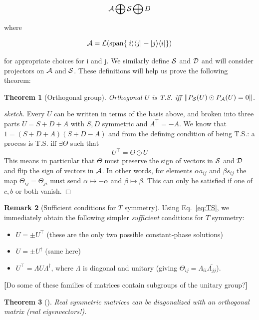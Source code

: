 \documentclass[aps,pra,12pt,nofootinbib,superscriptaddress,longbibliography,showpacs]{revtex4-1}
\newcommand{\yo}[1]{\textcolor{dblue}{\textbf{[}#1\textbf{]}}}
\theoremstyle{plain}
\newtheorem{theorem}{Theorem}   %
\theoremstyle{definition}
\newtheorem{remark}[theorem]{Remark}
\newcommand{\bra}[1]{\mbox{$\langle #1|$}}
\newcommand{\ket}[1]{\ensuremath{|#1\rangle}}
\newcommand{\hprod}{\odot}
\def\2#1{{\cal #1}}
\begin{document}
$$ \2 A \bigoplus \2 S \bigoplus D $$ 

where 

$$ \2 A = \2L (\text{span} \{\ket{i}\bra{j} - \ket{j}\bra{i}\}) $$ 

for appropriate choices for i and j.  We similarly define $\2 S$ and $\2 D$ and will consider projectors on $\2A$ and $\2S$.  These definitions will help us prove the following 
theorem: 

\begin{theorem}[Orthogonal group] 
Orthogonal $U$ is T.S. iff $\Arrowvert P_{\2S}(U)\hprod P_{\2A}(U) = 0 \Arrowvert$.
\end{theorem}

\begin{proof}[sketch] 
Every $U$ can be written in terms of the basis above, and broken into three parts 
$U = S + D + A$ 
with $S,D$ symmetric and $A^\top = -A$. 
We know that 
$1 = (S+D+A)(S+D-A)$
and from the defining condition of being T.S.: a process is T.S. iff $\exists \Theta$ such that 
$$ U^\top = \Theta \hprod U $$ 
This means in particular that $\Theta$ must preserve the sign of vectors in $\2 S$ and $\2 D$ and flip the sign 
of vectors in $\2 A$.  In other words, for elements 
$\alpha a_{ij}$ and $\beta s_{ij}$ the map $\Theta_{ij}=\Theta_{ji}$ must send $\alpha \mapsto -\alpha$ and 
$\beta \mapsto \beta$.  This can only be satisfied if one of $c, b$ or both vanish.  
\end{proof}





\begin{remark}[Sufficient conditions for $T$ symmetry] 
\label{rmk:sufficient-t-sym}
Using Eq.~\eqref{eq:TS}, we immediately obtain the following simpler
\emph{sufficient} conditions for $T$ symmetry:
\begin{itemize} 
\item $U = \pm U^\top$  (these are the only two possible constant-phase solutions)
\item $U = \pm U^\dagger$ (same here)
\item $U^\top = \Lambda U \Lambda^\dagger$, where $\Lambda$ is diagonal
  and unitary (giving $\Theta_{ij} = \Lambda_{ii} \overline{\Lambda_{jj}}$).
\end{itemize}

\yo{Do some of these families of matrices contain subgroups of the
  unitary group?}
\end{remark}

\begin{theorem}[]
Real symmetric matrices can be diagonalized with an orthogonal matrix
(real eigenvectors!). 
\end{theorem}  
\end{document}
